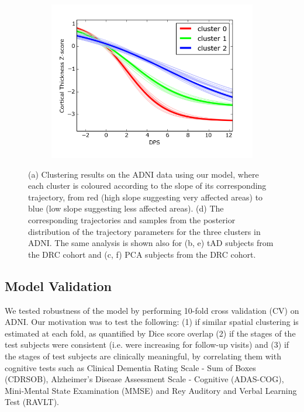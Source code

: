 \begin{figure}[h]
\begin{subfigure}[b]{0.3\textwidth}
  \end{subfigure}
    \begin{subfigure}[b]{0.3\textwidth}
    \centering
    \includegraphics[width=\scalingFactorTraj\textwidth]{images/vwdpm/trajSamplesOneFig_drcThavgFWHM0InithistCl3Pr0Ra1_VWDPMStdPCA.png}
    \caption{}
      \label{fig:drcTrajPCA}
  \end{subfigure}
  
  \caption{(a) Clustering results on the ADNI data using our model, where each cluster is coloured according to the slope of its corresponding trajectory, from red (high slope suggesting very affected areas) to blue (low slope suggesting less affected areas). (d) The corresponding trajectories and samples from the posterior distribution of the trajectory  parameters for the three clusters in ADNI. The same analysis is shown also for (b, e) tAD subjects from the DRC cohort and (c, f) PCA subjects from the DRC cohort.}
  \label{fig:clustTrajAll}

\end{figure}

\subsection{Model Validation}
\label{sec:vwdpm_validation}

We tested robustness of the model by performing 10-fold cross validation (CV) on ADNI. Our motivation was to test the following: (1) if similar spatial clustering is estimated at each fold, as quantified by Dice score overlap (2) if the stages of the test subjects were consistent (i.e. were increasing for follow-up visits) and (3) if the stages of test subjects are clinically meaningful, by correlating them with cognitive tests such as Clinical Dementia Rating Scale - Sum of Boxes (CDRSOB), Alzheimer's Disease Assessment Scale - Cognitive (ADAS-COG), Mini-Mental State Examination (MMSE) and Rey Auditory and Verbal Learning Test (RAVLT).

